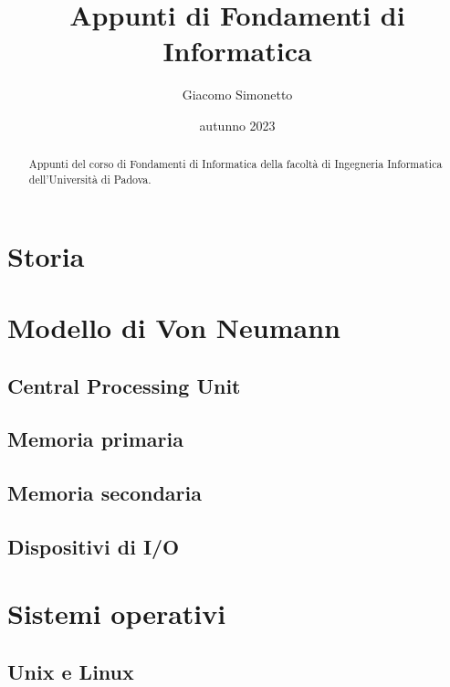 \documentclass{article}
\title{Appunti di Fondamenti di Informatica}
\author{Giacomo Simonetto}
\date{autunno 2023}
\begin{document}
\maketitle
\begin{abstract}
	Appunti del corso di Fondamenti di Informatica della facoltà di Ingegneria Informatica dell'Università di Padova.
\end{abstract}

\newpage

\tableofcontents

\newpage

\section{Storia}

\section{Modello di Von Neumann}
\subsection{Central Processing Unit}
\subsection{Memoria primaria}
\subsection{Memoria secondaria}
\subsection{Dispositivi di I/O}

\section{Sistemi operativi}
\subsection{Unix e Linux}
\end{document}
